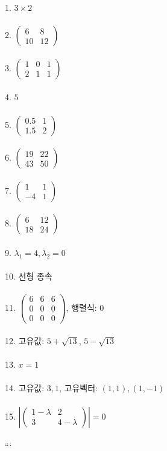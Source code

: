 \documentclass[fleqn]{article}
\begin{document}
1. $3 \times 2$ \\\\
2. $\begin{pmatrix} 6 & 8 \\ 10 & 12 \end{pmatrix}$ \\\\
3. $\begin{pmatrix} 1 & 0 & 1 \\ 2 & 1 & 1 \end{pmatrix}$ \\\\
4. $5$ \\\\
5. $\begin{pmatrix} 0.5 & 1 \\ 1.5 & 2 \end{pmatrix}$ \\\\
6. $\begin{pmatrix} 19 & 22 \\ 43 & 50 \end{pmatrix}$ \\\\
7. $\begin{pmatrix} 1 & 1 \\ -4 & 1 \end{pmatrix}$ \\\\
8. $\begin{pmatrix} 6 & 12 \\ 18 & 24 \end{pmatrix}$ \\\\
9. $ \lambda_1 = 4, \lambda_2 = 0$ \\\\
10. 선형 종속 \\\\
11. $\begin{pmatrix} 6 & 6 & 6 \\ 0 & 0 & 0 \\ 0 & 0 & 0 \end{pmatrix}$, 행렬식: $0$ \\\\
12. 고유값: $5 + \sqrt{13}$, $5 - \sqrt{13}$ \\\\
13. $x = 1$ \\\\
14. 고유값: $3, 1$, 고유벡터: $(1, 1), (1, -1)$ \\\\
15. $|\begin{pmatrix} 1 - \lambda & 2 \\ 3 & 4 - \lambda \end{pmatrix}| = 0$ \\\\
```      
        
\end{document}
